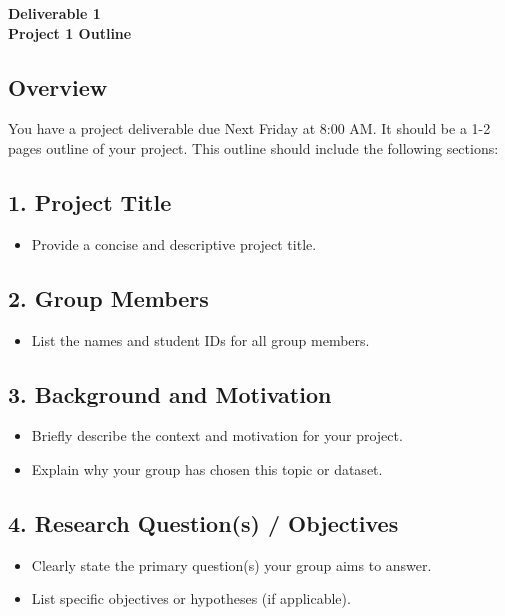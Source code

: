 \documentclass[12pt]{article}
\begin{document}
\begin{center}
\textbf{\Large Deliverable 1 \\ Project 1 Outline} 
\end{center}

\subsection*{Overview}
You have a project deliverable due Next Friday at 8:00 AM. It should be a 1-2 pages outline of your project.
This outline should include the following sections:


\subsection*{1. Project Title}
\begin{itemize}
    \item Provide a concise and descriptive project title.
\end{itemize}

\subsection*{2. Group Members}
\begin{itemize}
    \item List the names and student IDs for all group members.
\end{itemize}

\subsection*{3. Background and Motivation}
\begin{itemize}
    \item Briefly describe the context and motivation for your project.
    \item Explain why your group has chosen this topic or dataset.
\end{itemize}

\subsection*{4. Research Question(s) / Objectives}
\begin{itemize}
    \item Clearly state the primary question(s) your group aims to answer.
    \item List specific objectives or hypotheses (if applicable).
\end{itemize}
\end{document}
